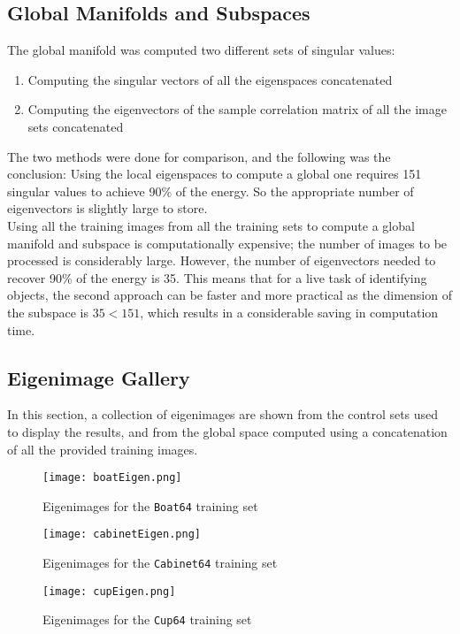 \documentclass[10pt,twocolumn,letterpaper]{article}
\begin{document}
\subsection{Global Manifolds and Subspaces}
The global manifold was computed two different sets of singular values:
\begin{enumerate}
\item Computing the singular vectors of all the eigenspaces concatenated
\item Computing the eigenvectors of the sample correlation matrix of all the image sets concatenated
\end{enumerate}
The two methods were done for comparison, and the following was the conclusion:
Using the local eigenspaces to compute a global one requires 151 singular values to achieve 90\% of the energy. So the appropriate number of eigenvectors is slightly large to store.\\
Using all the training images from all the training sets to compute a global manifold and subspace is computationally expensive; the number of images to be processed is considerably large. However, the number of eigenvectors needed to recover 90\% of the energy is 35. This means that for a live task of identifying objects, the second approach can be faster and more practical as the dimension of the subspace is $35 < 151$, which results in a considerable saving in computation time.
\subsection{Eigenimage Gallery}
In this section, a collection of eigenimages are shown from the control sets used to display the results, and from the global space computed using a concatenation of all the provided training images.
\begin{figure}
\texttt{[image: boatEigen.png]}
\caption{Eigenimages for the \texttt{Boat64} training set}
\label{fig:eigenBoat}
\end{figure}

\begin{figure}
\texttt{[image: cabinetEigen.png]}
\caption{Eigenimages for the \texttt{Cabinet64} training set}
\label{fig:eigenCabinet}
\end{figure}

\begin{figure}
\texttt{[image: cupEigen.png]}
\caption{Eigenimages for the \texttt{Cup64} training set}
\label{fig:eigenCup}
\end{figure}
\end{document}
